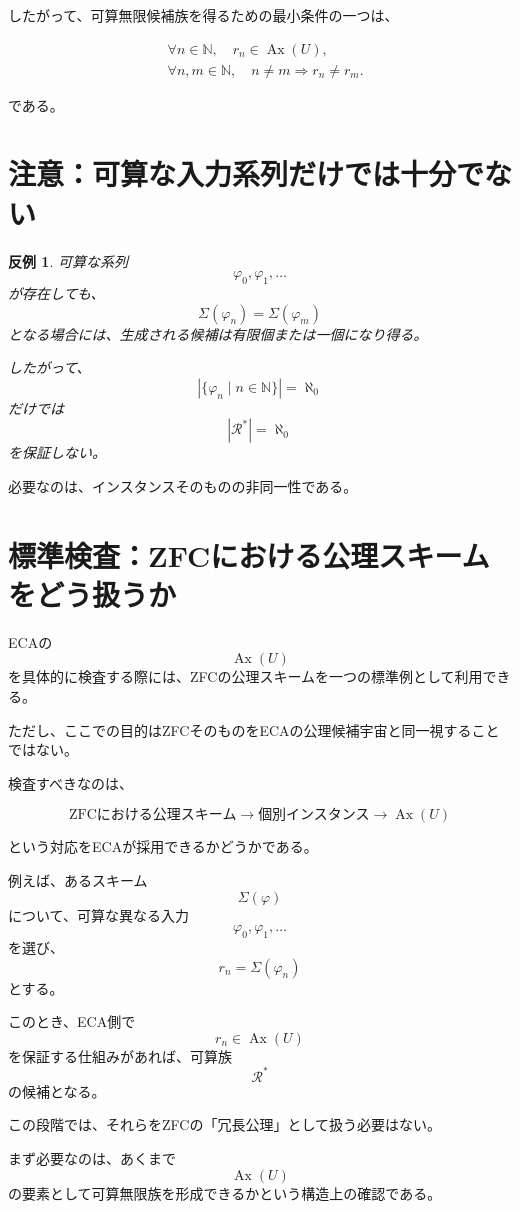 \documentclass[a4paper,11pt]{ltjsarticle}
\newtheorem{counterexample}[definition]{反例}
\begin{document}
したがって、可算無限候補族を得るための最小条件の一つは、

\[
\boxed{
\begin{aligned}
&\forall n\in\mathbb N,\quad
r_n\in\operatorname{Ax}(U),\\
&\forall n,m\in\mathbb N,\quad
n\neq m\Rightarrow r_n\neq r_m.
\end{aligned}
}
\]

である。

\section{注意：可算な入力系列だけでは十分でない}

\begin{counterexample}
可算な系列
\[
\varphi_0,\varphi_1,\ldots
\]
が存在しても、
\[
\Sigma(\varphi_n)=\Sigma(\varphi_m)
\]
となる場合には、生成される候補は有限個または一個になり得る。

したがって、
\[
|\{\varphi_n\mid n\in\mathbb N\}|=\aleph_0
\]
だけでは
\[
|\mathcal R^*|=\aleph_0
\]
を保証しない。
\end{counterexample}

必要なのは、インスタンスそのものの非同一性である。

\section{標準検査：ZFCにおける公理スキームをどう扱うか}

ECAの
\[
\operatorname{Ax}(U)
\]
を具体的に検査する際には、ZFCの公理スキームを一つの標準例として利用できる。

ただし、ここでの目的はZFCそのものをECAの公理候補宇宙と同一視することではない。

検査すべきなのは、

\[
\text{ZFCにおける公理スキーム}
\longrightarrow
\text{個別インスタンス}
\longrightarrow
\operatorname{Ax}(U)
\]

という対応をECAが採用できるかどうかである。

例えば、あるスキーム
\[
\Sigma(\varphi)
\]
について、可算な異なる入力
\[
\varphi_0,\varphi_1,\ldots
\]
を選び、
\[
r_n=\Sigma(\varphi_n)
\]
とする。

このとき、ECA側で
\[
r_n\in\operatorname{Ax}(U)
\]
を保証する仕組みがあれば、可算族
\[
\mathcal R^*
\]
の候補となる。

この段階では、それらをZFCの「冗長公理」として扱う必要はない。

まず必要なのは、あくまで
\[
\operatorname{Ax}(U)
\]
の要素として可算無限族を形成できるかという構造上の確認である。
\end{document}
